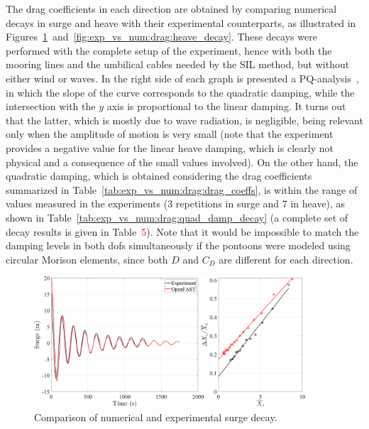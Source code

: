 The drag coefficients in each direction are obtained by comparing numerical decays in surge and heave with their experimental counterparts, as illustrated in Figures~\ref{fig:exp_vs_num:drag:surge_decay}~and~\ref{fig:exp_vs_num:drag:heave_decay}. These decays were performed with the complete setup of the experiment, hence with both the mooring lines and the umbilical cables needed by the SIL method, but without either wind or waves. In the right side of each graph is presented a PQ-analysis~\citep{burmester2020}, in which the slope of the curve corresponds to the quadratic damping, while the intersection with the $y$ axis is proportional to the linear damping. It turns out that the latter, which is mostly due to wave radiation, is negligible, being relevant only when the amplitude of motion is very small (note that the experiment provides a negative value for the linear heave damping, which is clearly not physical and a consequence of the small values involved). On the other hand, the quadratic damping, which is obtained considering the drag coefficients summarized in Table~\ref{tab:exp_vs_num:drag:drag_coeffs}, is within the range of values measured in the experiments (3 repetitions in surge and 7 in heave), as shown in Table~\ref{tab:exp_vs_num:drag:quad_damp_decay} (a complete set of decay results is given in Table~\textcolor{red}{5}). Note that it would be impossible to match the damping levels in both dofs simultaneously if the pontoons were modeled using circular Morison elements, since both $D$ and $C_D$ are different for each direction. 
\begin{figure}[!hbtp]
	\centering
	\includegraphics[width=0.9\textwidth]{./figures/surge_decay_drag_pontoon.png}	
	\caption{Comparison of numerical and experimental surge decay.} \label{fig:exp_vs_num:drag:surge_decay}
\end{figure}

